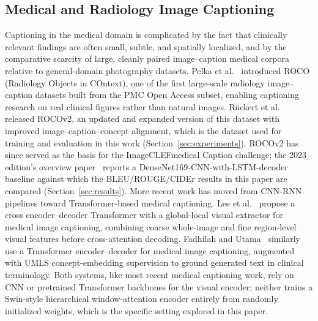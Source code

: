 \documentclass[conference]{IEEEtran}
\begin{document}
\subsection{Medical and Radiology Image Captioning}
Captioning in the medical domain is complicated by the fact that clinically relevant findings are often small, subtle, and spatially localized, and by the comparative scarcity of large, cleanly paired image--caption medical corpora relative to general-domain photography datasets. Pelka et al.~\cite{pelka2018roco} introduced ROCO (Radiology Objects in COntext), one of the first large-scale radiology image--caption datasets built from the PMC Open Access subset, enabling captioning research on real clinical figures rather than natural images. Rückert et al.~\cite{ruckert2024rocov2} released ROCOv2, an updated and expanded version of this dataset with improved image--caption--concept alignment, which is the dataset used for training and evaluation in this work (Section~\ref{sec:experiments}). ROCOv2 has since served as the basis for the ImageCLEFmedical Caption challenge; the 2023 edition's overview paper~\cite{ruckert2023imageclef} reports a DenseNet169-CNN-with-LSTM-decoder baseline against which the BLEU/ROUGE/CIDEr results in this paper are compared (Section~\ref{sec:results}). More recent work has moved from CNN-RNN pipelines toward Transformer-based medical captioning. Lee et al.~\cite{lee2022cross} propose a cross encoder--decoder Transformer with a global-local visual extractor for medical image captioning, combining coarse whole-image and fine region-level visual features before cross-attention decoding. Fadhilah and Utama~\cite{fadhilah2026transformer} similarly use a Transformer encoder--decoder for medical image captioning, augmented with UMLS concept-embedding supervision to ground generated text in clinical terminology. Both systems, like most recent medical captioning work, rely on CNN or pretrained Transformer backbones for the visual encoder; neither trains a Swin-style hierarchical window-attention encoder entirely from randomly initialized weights, which is the specific setting explored in this paper.
\end{document}
